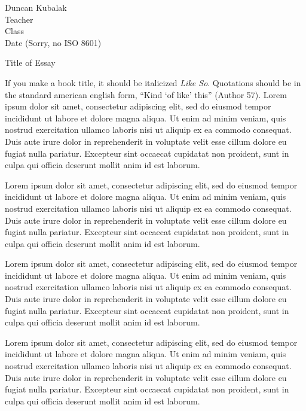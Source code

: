 \documentclass[12pt]{article}
\begin{document}
\begin{flushleft}

Duncan Kubalak\\
Teacher\\
Class\\
Date (Sorry, no ISO 8601)\\

\begin{center}
Title of Essay
\end{center}

\setlength{\parindent}{0.5in}

If you make a book title, it should be italicized \textit{Like So}. Quotations should be in the standard american english form, ``Kind `of like' this'' (Author 57).  Lorem ipsum dolor sit amet, consectetur adipiscing elit, sed do eiusmod tempor incididunt ut labore et dolore magna aliqua. Ut enim ad minim veniam, quis nostrud exercitation ullamco laboris nisi ut aliquip ex ea commodo consequat. Duis aute irure dolor in reprehenderit in voluptate velit esse cillum dolore eu fugiat nulla pariatur. Excepteur sint occaecat cupidatat non proident, sunt in culpa qui officia deserunt mollit anim id est laborum.

Lorem ipsum dolor sit amet, consectetur adipiscing elit, sed do eiusmod tempor incididunt ut labore et dolore magna aliqua. Ut enim ad minim veniam, quis nostrud exercitation ullamco laboris nisi ut aliquip ex ea commodo consequat. Duis aute irure dolor in reprehenderit in voluptate velit esse cillum dolore eu fugiat nulla pariatur. Excepteur sint occaecat cupidatat non proident, sunt in culpa qui officia deserunt mollit anim id est laborum.

Lorem ipsum dolor sit amet, consectetur adipiscing elit, sed do eiusmod tempor incididunt ut labore et dolore magna aliqua. Ut enim ad minim veniam, quis nostrud exercitation ullamco laboris nisi ut aliquip ex ea commodo consequat. Duis aute irure dolor in reprehenderit in voluptate velit esse cillum dolore eu fugiat nulla pariatur. Excepteur sint occaecat cupidatat non proident, sunt in culpa qui officia deserunt mollit anim id est laborum.

Lorem ipsum dolor sit amet, consectetur adipiscing elit, sed do eiusmod tempor incididunt ut labore et dolore magna aliqua. Ut enim ad minim veniam, quis nostrud exercitation ullamco laboris nisi ut aliquip ex ea commodo consequat. Duis aute irure dolor in reprehenderit in voluptate velit esse cillum dolore eu fugiat nulla pariatur. Excepteur sint occaecat cupidatat non proident, sunt in culpa qui officia deserunt mollit anim id est laborum.


\end{flushleft}
\end{document}

